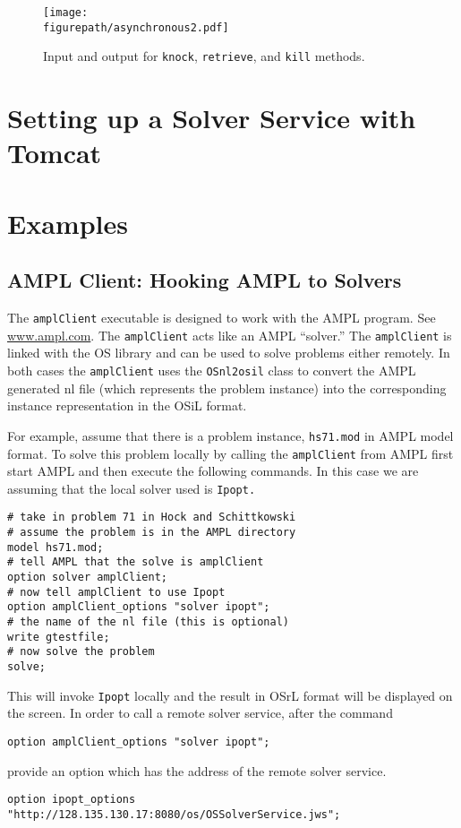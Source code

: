 \documentclass[11pt]{article}
\newcommand{\figurepath}{./figures}
\renewcommand{\_}{{\char"5F}}
\renewcommand{\{}{{\char"7B}}
\renewcommand{\}}{{\char"7D}}
\renewcommand{\^}{{\char"0D}}
\renewcommand{\'}{{\char"0D}}
\begin{document}
\begin{figure}[ht]
\centering
\texttt{[image: \\figurepath/asynchronous2.pdf]}
\caption{Input and output for {\tt knock}, {\tt retrieve}, and {\tt kill} methods.} 
\label{figure:async2}
\end{figure}

\section{Setting up a Solver Service with Tomcat}\label{section:tomcat}





\section{Examples}\label{section:examples}

\subsection{AMPL Client:  Hooking AMPL to Solvers}\label{section:amplclient}

The {\tt amplClient} executable is designed to work with the AMPL program. See \url{www.ampl.com}. The {\tt amplClient} acts like an AMPL ``solver.'' The {\tt amplClient} is linked with the OS library and can be used to solve problems either remotely. In both cases the {\tt amplClient} uses the {\tt OSnl2osil} class to convert the AMPL generated nl file (which represents the problem instance) into the corresponding instance representation in the OSiL format.  

For example, assume that there is a problem instance, {\tt hs71.mod} in AMPL model format. To solve this problem locally by calling the {\tt amplClient} from AMPL first start AMPL and then execute the following commands. In this case we are assuming that the local solver used is {\tt Ipopt.} 

\begin{verbatim}
# take in problem 71 in Hock and Schittkowski 
# assume the problem is in the AMPL directory
model hs71.mod;
# tell AMPL that the solve is amplClient
option solver amplClient;
# now tell amplClient to use Ipopt
option amplClient_options "solver ipopt";
# the name of the nl file (this is optional)
write gtestfile;
# now solve the problem
solve;
\end{verbatim}

This will invoke {\tt Ipopt} locally and the result in OSrL format will be displayed on the screen. In order to call a remote solver service, after the command
\begin{verbatim}
option amplClient_options "solver ipopt";
\end{verbatim}
provide an option which has the address of the remote solver service.
\begin{verbatim}
option ipopt_options "http://128.135.130.17:8080/os/OSSolverService.jws";
\end{verbatim}
\end{document}
